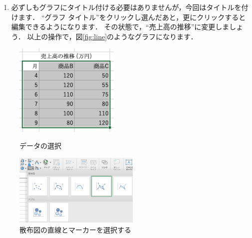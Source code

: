 \begin{enumerate}
\begin{enumerate}
        そうすると，縦軸に``軸ラベル''というラベルが追加されます．
        \item ``軸ラベル''をクリックし選んだあと，更にクリックすると編集できるようになります．
        縦軸は``売上高 (万円)''にしましょう\footnote{軸には単位を付けましょう．}．同様の手順で横軸を``月''にしましょう．
        そうすると，図\ref{fig:line4}のようなグラフができます．
    \end{enumerate}
    \item 必ずしもグラフにタイトル付ける必要はありませんが，今回はタイトルを付けます．
    ``グラフ タイトル''をクリックし選んだあと，更にクリックすると編集できるようになります．
    その状態で，``売上高の推移''に変更しましょう．
    以上の操作で，図\ref{fig:line}のようなグラフになります．
\end{enumerate}

\begin{figure}[tb]
    \begin{minipage}{0.5\hsize}
        \centering
        \includegraphics[width=5cm]{chap2/line_select_data.png}
        \caption{データの選択}
        \label{fig:line_select_data}
    \end{minipage}
    \begin{minipage}{0.5\hsize}
        \centering
        \includegraphics[width=6cm]{chap2/line_menu.png}
        \caption{散布図の直線とマーカーを選択する}
        \label{fig:line_menu}
    \end{minipage}
\end{figure}

